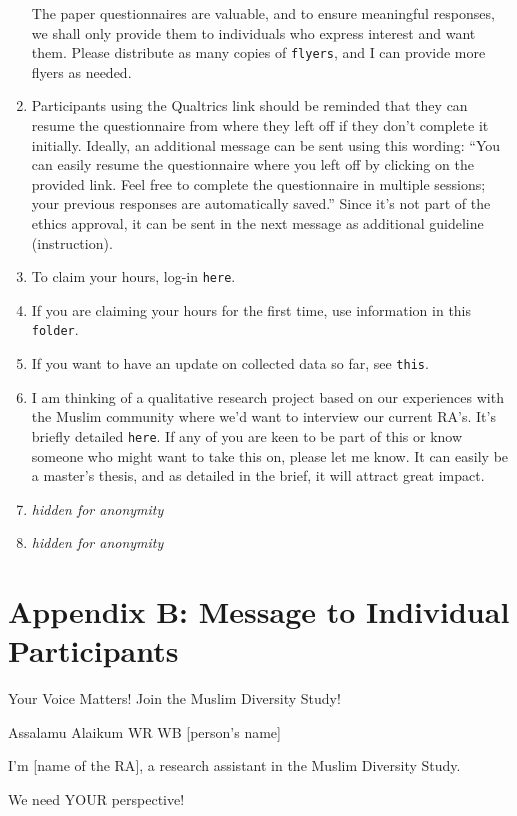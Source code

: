 \documentclass[
]{interact}
\begin{document}
\begin{enumerate}
  The paper questionnaires are valuable, and to ensure meaningful
  responses, we shall only provide them to individuals who express
  interest and want them. Please distribute as many copies of
  \texttt{flyers}, and I can provide more flyers as needed.
\item
  Participants using the Qualtrics link should be reminded that they can
  resume the questionnaire from where they left off if they don't
  complete it initially. Ideally, an additional message can be sent
  using this wording: ``You can easily resume the questionnaire where
  you left off by clicking on the provided link. Feel free to complete
  the questionnaire in multiple sessions; your previous responses are
  automatically saved.'' Since it's not part of the ethics approval, it
  can be sent in the next message as additional guideline (instruction).
\item
  To claim your hours, log-in \texttt{here}.
\item
  If you are claiming your hours for the first time, use information in
  this \texttt{folder}.
\item
  If you want to have an update on collected data so far, see
  \texttt{this}.
\item
  I am thinking of a qualitative research project based on our
  experiences with the Muslim community where we'd want to interview our
  current RA's. It's briefly detailed \texttt{here}. If any of you are
  keen to be part of this or know someone who might want to take this
  on, please let me know. It can easily be a master's thesis, and as
  detailed in the brief, it will attract great impact.
\item
  \emph{hidden for anonymity}
\item
  \emph{hidden for anonymity}
\end{enumerate}

\newpage{}

\section{Appendix B: Message to Individual
Participants}\label{appendix-b-message-to-individual-participants}

Your Voice Matters! Join the Muslim Diversity Study!

\noindent Assalamu Alaikum WR WB {[}person's name{]}

\noindent I'm {[}name of the RA{]}, a research assistant in the Muslim
Diversity Study.

\noindent We need YOUR perspective!
\end{document}
